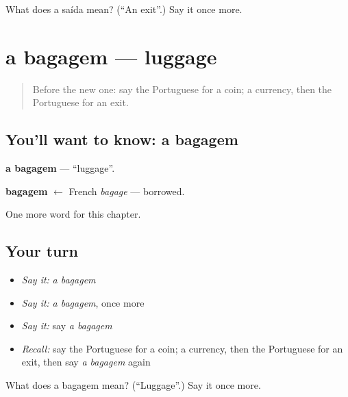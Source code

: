 \begin{tcolorbox}[breakable,colback=teal!4,colframe=teal!35!black,title={Before you move on}]
What does a saída mean? (\textquotedblleft{}An exit\textquotedblright{}.) Say it once more.
\end{tcolorbox}
\section[a bagagem]{a bagagem — luggage}

\label{lesson:PT-C223-bagagem}



\begin{quote}
Before the new one: say the Portuguese for a coin; a currency, then the Portuguese for an exit.
\end{quote}

\subsection*{You'll want to know: a bagagem}
\textbf{a bagagem} — \textquotedblleft{}luggage\textquotedblright{}.

\begin{cousinweb}
\textbf{bagagem} $\leftarrow$ French \emph{bagage} — borrowed.
\end{cousinweb}

\begin{grammarlens}[title={What you've built}]
One more word for this chapter.
\end{grammarlens}

\subsection*{Your turn}
\begin{itemize}
\raggedright
  \item \emph{Say it:} \emph{a bagagem}
  \item \emph{Say it:} \emph{a bagagem}, once more
  \item \emph{Say it:} say \emph{a bagagem}
  \item \emph{Recall:} say the Portuguese for a coin; a currency, then the Portuguese for an exit, then say \emph{a bagagem} again
\end{itemize}

\begin{tcolorbox}[breakable,colback=teal!4,colframe=teal!35!black,title={Before you move on}]
What does a bagagem mean? (\textquotedblleft{}Luggage\textquotedblright{}.) Say it once more.
\end{tcolorbox}

